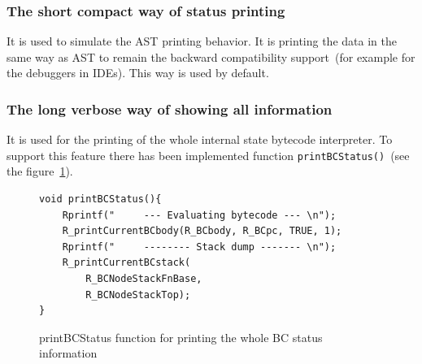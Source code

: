 \documentclass[thesis=M,english]{FITthesis}[2018/10/20]
\newcommand{\code}[1]{\texttt{#1}}
\begin{document}
\subsubsection{The short compact way of status printing}\label{short-compact-way-of-status-printing}
It is used to simulate the AST printing behavior. It is printing the data in the same way as AST to remain the backward compatibility support~(for example for the debuggers in IDEs). This way is used by default.

\subsubsection{The long verbose way of showing all information}\label{long-verbose-way}
It is used for the printing of the whole internal state bytecode interpreter. To support this feature there has been implemented function \code{printBCStatus()}~(see the figure~\ref{fig:printbcstatus-code}).

\begin{figure}[H]
\begin{lstlisting}
void printBCStatus(){
    Rprintf("     --- Evaluating bytecode --- \n");
    R_printCurrentBCbody(R_BCbody, R_BCpc, TRUE, 1);
    Rprintf("     -------- Stack dump ------- \n");
    R_printCurrentBCstack(
    	R_BCNodeStackFnBase,
    	R_BCNodeStackTop);
}
\end{lstlisting}
	\caption{printBCStatus function for printing the whole BC status information}\label{fig:printbcstatus-code}
\end{figure}
\end{document}
